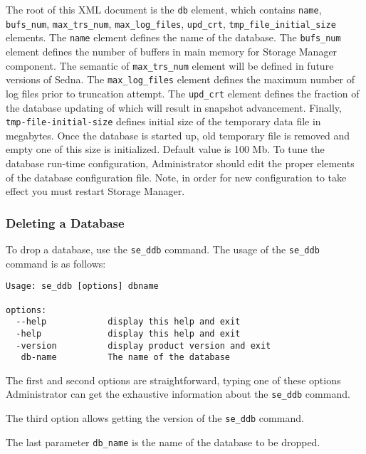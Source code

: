 \documentclass[a4paper,12pt]{article}
\begin{document}
The root of this XML document is the \verb!db! element, which contains
\verb!name!, \verb!bufs_num!, \verb!max_trs_num!, \verb!max_log_files!,
\verb!upd_crt!, \verb!tmp_file_initial_size! elements. The \verb!name! element
defines the name of the database. The \verb!bufs_num! element defines the number
of buffers in main memory for Storage Manager component. The semantic of
\verb!max_trs_num! element will be defined in future versions of Sedna. The
\verb!max_log_files! element defines the maximum number of log files prior to
truncation attempt. The \verb!upd_crt! element defines the fraction of the
database updating of which will result in snapshot advancement. Finally,
\verb!tmp-file-initial-size! defines initial size of the temporary data file in
megabytes. Once the database is started up, old temporary file is removed and
empty one of this size is initialized. Default value is 100 Mb.
To tune the database run-time configuration, Administrator should edit the
proper elements of the database configuration file. Note, in order for new
configuration to take effect you must restart Storage Manager.


\subsubsection{Deleting a Database}

To drop a database, use the \verb!se_ddb! command. The usage of the
\verb!se_ddb! command is as follows:

\small{
\begin{verbatim}
Usage: se_ddb [options] dbname

options:
  --help            display this help and exit
  -help             display this help and exit
  -version          display product version and exit
   db-name          The name of the database
\end{verbatim}}

The first and second options are straightforward, typing one of these options
Administrator can get the exhaustive information about the \verb!se_ddb!
command.

The third option allows getting the version of the \verb!se_ddb! command.

The last parameter \verb!db_name! is the name of the database to be dropped.
\end{document}
